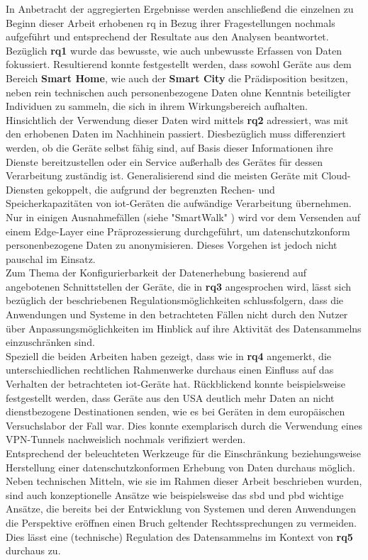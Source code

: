 In Anbetracht der aggregierten Ergebnisse werden anschließend die einzelnen zu Beginn dieser Arbeit erhobenen \ac{rq} in Bezug ihrer Fragestellungen nochmals aufgeführt und entsprechend der Resultate aus den Analysen beantwortet. Bezüglich \textbf{\ac{rq}1} wurde das bewusste, wie auch unbewusste Erfassen von Daten fokussiert. Resultierend konnte festgestellt werden, dass sowohl Geräte aus dem Bereich \textbf{Smart Home}, wie auch der \textbf{Smart City} die Prädisposition besitzen, neben rein technischen auch personenbezogene Daten ohne Kenntnis beteiligter Individuen zu sammeln, die sich in ihrem Wirkungsbereich aufhalten.\\
Hinsichtlich der Verwendung dieser Daten wird mittels \textbf{\ac{rq}2} adressiert, was mit den erhobenen Daten im Nachhinein passiert. Diesbezüglich muss differenziert werden, ob die Geräte selbst fähig sind, auf Basis dieser Informationen ihre Dienste bereitzustellen oder ein Service außerhalb des Gerätes für dessen Verarbeitung zuständig ist. Generalisierend sind die meisten Geräte mit Cloud-Diensten gekoppelt, die aufgrund der begrenzten Rechen- und Speicherkapazitäten von \ac{iot}-Geräten die aufwändige Verarbeitung übernehmen. Nur in einigen Ausnahmefällen (siehe "SmartWalk" \cite{Natix2022}) wird vor dem Versenden auf einem Edge-Layer eine Präprozessierung durchgeführt, um datenschutzkonform personenbezogene Daten zu anonymisieren. Dieses Vorgehen ist jedoch nicht pauschal im Einsatz.\\
Zum Thema der Konfigurierbarkeit der Datenerhebung basierend auf angebotenen Schnittstellen der Geräte, die in \textbf{\ac{rq}3} angesprochen wird, lässt sich bezüglich der beschriebenen Regulationsmöglichkeiten schlussfolgern, dass die Anwendungen und Systeme in den betrachteten Fällen nicht durch den Nutzer über Anpassungsmöglichkeiten im Hinblick auf ihre Aktivität des Datensammelns einzuschränken sind.\\
Speziell die beiden Arbeiten \cite{Mandalari2021,Ren2019} haben gezeigt, dass wie in \textbf{\ac{rq}4} angemerkt, die unterschiedlichen rechtlichen Rahmenwerke durchaus einen Einfluss auf das Verhalten der betrachteten \ac{iot}-Geräte hat. Rückblickend konnte beispielsweise festgestellt werden, dass Geräte aus den USA deutlich mehr Daten an nicht dienstbezogene Destinationen senden, wie es bei Geräten in dem europäischen Versuchslabor der Fall war. Dies konnte exemplarisch durch die Verwendung eines VPN-Tunnels nachweislich nochmals verifiziert werden.\\
Entsprechend der beleuchteten Werkzeuge für die Einschränkung beziehungsweise Herstellung einer datenschutzkonformen Erhebung von Daten durchaus möglich. Neben technischen Mitteln, wie sie im Rahmen dieser Arbeit beschrieben wurden, sind auch konzeptionelle Ansätze wie beispielsweise das \ac{sbd} und \ac{pbd} wichtige Ansätze, die bereits bei der Entwicklung von Systemen und deren Anwendungen die Perspektive eröffnen einen Bruch geltender Rechtssprechungen zu vermeiden. Dies lässt eine (technische) Regulation des Datensammelns im Kontext von \textbf{\ac{rq}5} durchaus zu.\\
